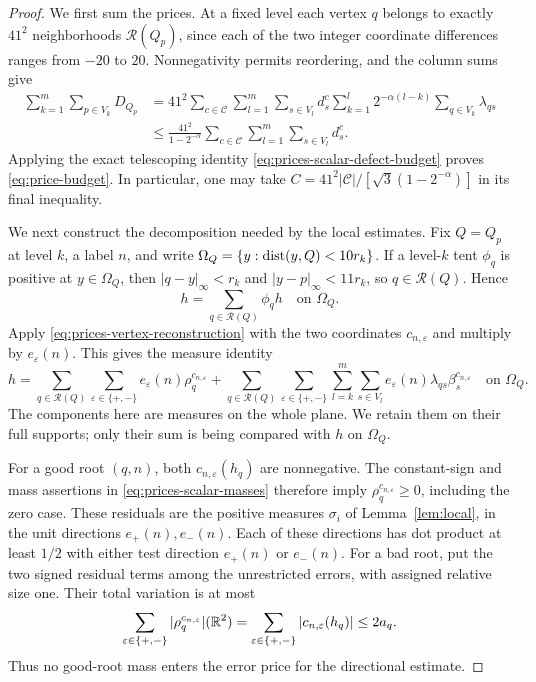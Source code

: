 \begin{proof}
We first sum the prices. At a fixed level each vertex $q$ belongs
to exactly $41^2$ neighborhoods $\mathcal R(Q_p)$, since each of
the two integer coordinate differences ranges from $-20$ to $20$.
Nonnegativity permits reordering, and the column sums give
\begin{align*}
 \sum_{k=1}^m\sum_{p\in V_k}D_{Q_p}
 &=41^2\sum_{c\in\mathcal C}\sum_{l=1}^m\sum_{s\in V_l}d_s^c
       \sum_{k=1}^l2^{-\alpha(l-k)}
          \sum_{q\in V_k}\lambda_{qs}\\
 &\le\frac{41^2}{1-2^{-\alpha}}
       \sum_{c\in\mathcal C}\sum_{l=1}^m\sum_{s\in V_l}d_s^c.
\end{align*}
Applying the exact telescoping identity
\eqref{eq:prices-scalar-defect-budget} proves
\eqref{eq:price-budget}. In particular, one may take
$C=41^2|\mathcal C|/[\sqrt3(1-2^{-\alpha})]$ in its final
inequality.

We next construct the decomposition needed by the local estimates.
Fix $Q=Q_p$ at level $k$, a label $n$, and write
$\Omega_Q=\{y:\operatorname{dist}(y,Q)<10r_k\}$. If a level-$k$ tent
$\phi_q$ is positive at $y\in\Omega_Q$, then
$|q-y|_\infty<r_k$ and $|y-p|_\infty<11r_k$, so
$q\in\mathcal R(Q)$. Hence
\begin{equation}
 h=\sum_{q\in\mathcal R(Q)}\phi_qh
 \quad\text{on }\Omega_Q.
 \label{eq:prices-local-partition}
\end{equation}
Apply \eqref{eq:prices-vertex-reconstruction} with the two
coordinates $c_{n,\varepsilon}$ and multiply by
$e_\varepsilon(n)$. This gives the measure identity
\begin{equation}\label{eq:prices-vector-decomposition}
 h=\sum_{q\in\mathcal R(Q)}\sum_{\varepsilon\in\{+,-\}}
            e_\varepsilon(n)\rho_q^{c_{n,\varepsilon}}
   +\sum_{q\in\mathcal R(Q)}\sum_{\varepsilon\in\{+,-\}}
        \sum_{l=k}^m\sum_{s\in V_l}
            e_\varepsilon(n)\lambda_{qs}\beta_s^{c_{n,\varepsilon}}
 \quad\text{on }\Omega_Q.
\end{equation}
The components here are measures on the whole plane. We retain
them on their full supports; only their sum is being compared
with $h$ on $\Omega_Q$.

For a good root $(q,n)$, both $c_{n,\varepsilon}(h_q)$ are
nonnegative. The constant-sign and mass assertions in
\eqref{eq:prices-scalar-masses} therefore imply
$\rho_q^{c_{n,\varepsilon}}\ge0$, including the zero case.
These residuals are the positive measures $\sigma_i$ of
Lemma~\ref{lem:local}, in the unit directions $e_+(n),e_-(n)$.
Each of these directions has dot product at least $1/2$ with
either test direction $e_+(n)$ or $e_-(n)$.
For a bad root, put the two signed residual terms among the
unrestricted errors, with assigned relative size one. Their total
variation is at most
\[
 \sum_{\varepsilon\in\{+,-\}}
       |\rho_q^{c_{n,\varepsilon}}|(\mathbb R^2)
 =\sum_{\varepsilon\in\{+,-\}}|c_{n,\varepsilon}(h_q)|
 \le2a_q.
\]
Thus no good-root mass enters the error price for the directional
estimate.


\end{proof}
